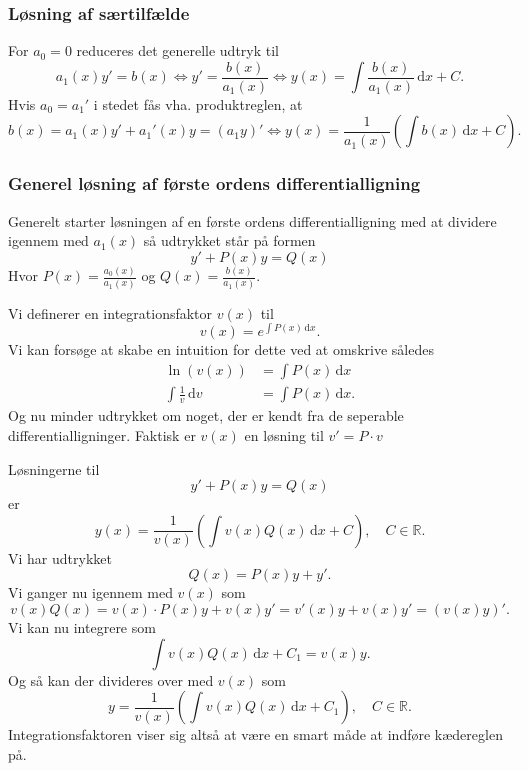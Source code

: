 \subsubsection{Løsning af særtilfælde}
For $a_0 = 0$ reduceres det generelle udtryk til
\[ 
a_1(x)y' = b(x) \iff y' = \frac{b(x)}{a_1(x)} \iff y(x) = \int \frac{b(x)}{a_1(x)} \, \mathrm{d}x + C
.\]
Hvis $a_0 = a_1'$ i stedet fås vha. produktreglen, at
\[ 
b(x) = a_1(x)y' + a_1'(x)y = (a_1y)' \iff y(x) = \frac{1}{a_1(x)} \left( \int b(x) \, \mathrm{d}x + C \right)
.\]

\subsubsection{Generel løsning af første ordens differentialligning}
Generelt starter løsningen af en første ordens differentialligning med at dividere igennem med $a_1(x)$ så udtrykket står på formen
\[ 
y' + P(x)y = Q(x)
\]
Hvor $P (x) = \frac{a_0(x)}{a_1(x)}$ og $Q(x) = \frac{b(x)}{a_1(x)}$.

\begin{definition} [Integrationsfaktor]
  Vi definerer en integrationsfaktor $v(x)$ til
  \[ 
  v(x) = e^{\int P(x) \, \mathrm{d}x }
  .\]
  \bigbreak
  Vi kan forsøge at skabe en intuition for dette ved at omskrive således
  \begin{align*}
    \ln(v(x)) &= \int P(x) \, \mathrm{d}x \\
    \int \frac{1}{v} \, \mathrm{d}v &= \int P(x) \, \mathrm{d}x 
  .\end{align*}
  Og nu minder udtrykket om noget, der er kendt fra de seperable differentialligninger. Faktisk er $v(x)$ en løsning til $v' = P \cdot v$
\end{definition}

\begin{sæt} 
  Løsningerne til 
  \[ 
  y' + P(x)y = Q(x)
  \]
  er
  \[ 
  y(x) = \frac{1}{v(x)} \left( \int v(x)Q(x)\, \mathrm{d}x + C \right), \quad C \in \mathbb{R}
  .\]
  \tcblower
  Vi har udtrykket
  \[ 
  Q(x) = P(x)y + y'
  .\]
  Vi ganger nu igennem med $v(x)$ som
  \[ 
  v(x)Q(x) = v(x)\cdot P(x) y + v(x)y' = v'(x)y + v(x)y' = (v(x)y)'
  .\]
  Vi kan nu integrere som
  \[ 
  \int v(x)Q(x) \, \mathrm{d}x + C_1 = v(x)y
  .\]
  Og så kan der divideres over med $v(x)$ som
  \[ 
  y = \frac{1}{v(x)} \left( \int v(x)Q(x) \, \mathrm{d}x + C_1 \right), \quad C \in \mathbb{R}
  .\]
  Integrationsfaktoren viser sig altså at være en smart måde at indføre kædereglen på.
\end{sæt}

